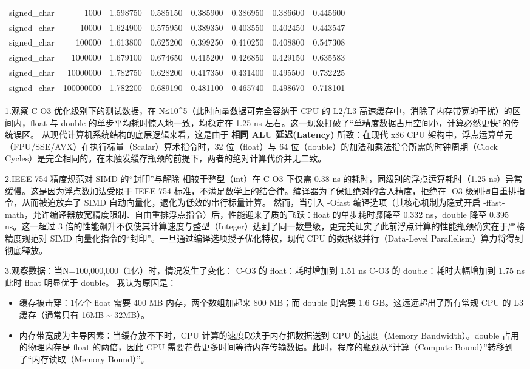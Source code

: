 \documentclass[12pt,fontset=none]{ctexart}
\providecommand{\tightlist}{%
  \setlength{\itemsep}{0pt}\setlength{\parskip}{0pt}}
\begin{document}
{\begin{longtable}[]{@{}lrrrrrrr@{}}
signed\_char & 1000 & 1.598750 & 0.585150 & 0.385900 & 0.386950 &
0.386600 & 0.445600 \\
signed\_char & 10000 & 1.624900 & 0.575950 & 0.389350 & 0.403550 &
0.402450 & 0.443547 \\
signed\_char & 100000 & 1.613800 & 0.625200 & 0.399250 & 0.410250 &
0.408800 & 0.547308 \\
signed\_char & 1000000 & 1.679100 & 0.674650 & 0.415200 & 0.426850 &
0.429150 & 0.635583 \\
signed\_char & 10000000 & 1.782750 & 0.628200 & 0.417350 & 0.431400 &
0.495500 & 0.732225 \\
signed\_char & 100000000 & 1.782200 & 0.689190 & 0.481100 & 0.465740 &
0.498670 & 0.718101 \\
\end{longtable}
}

1.观察 C-O3 优化级别下的测试数据，在 N≤10\^{}5（此时向量数据可完全容纳于
CPU 的 L2/L3 高速缓存中，消除了内存带宽的干扰）的区间内，float 与 double
的单步平均耗时惊人地一致，均稳定在 1.25 ns
左右。这一现象打破了``单精度数据占用空间小，计算必然更快''的传统误区。
从现代计算机系统结构的底层逻辑来看，这是由于 \textbf{相同 ALU
延迟(Latency)} 所致：在现代 x86 CPU
架构中，浮点运算单元（FPU/SSE/AVX）在执行标量（Scalar）算术指令时，32
位（float）与 64 位（double）的加法和乘法指令所需的时钟周期（Clock
Cycles）是完全相同的。在未触发缓存瓶颈的前提下，两者的绝对计算代价并无二致。

2.IEEE 754 精度规范对 SIMD 的``封印''与解除 相较于整型（int）在 C-O3
下仅需 0.38 ns 的耗时，同级别的浮点运算耗时（1.25
ns）异常缓慢。这是因为浮点数加法受限于 IEEE 754
标准，不满足数学上的结合律。编译器为了保证绝对的舍入精度，拒绝在 -O3
级别擅自重排指令，从而被迫放弃了 SIMD
自动向量化，退化为低效的串行标量计算。 然而，当引入 -Ofast
编译选项（其核心机制为隐式开启
-ffast-math，允许编译器放宽精度限制、自由重排浮点指令）后，性能迎来了质的飞跃：float
的单步耗时骤降至 0.332 ns，double 降至 0.395 ns。这一超过 3
倍的性能飙升不仅使其计算速度与整型（Integer）达到了同一数量级，更完美证实了此前浮点计算的性能瓶颈确实在于严格精度规范对
SIMD 向量化指令的``封印''。一旦通过编译选项授予优化特权，现代 CPU
的数据级并行（Data-Level Parallelism）算力将得到彻底释放。

3.观察数据：当N=100,000,000（1亿）时，情况发生了变化： C-O3 的
float：耗时增加到 1.51 ns C-O3 的 double：耗时大幅增加到 1.75 ns 此时
float 明显优于 double。 我认为原因是：

\begin{itemize}
\tightlist
\item
  缓存被击穿：1亿个 float 需要 400 MB 内存，两个数组加起来 800 MB；而
  double 则需要 1.6 GB。这远远超出了所有常规 CPU 的 L3 缓存（通常只有
  16MB \textasciitilde{} 32MB）。
\item
  内存带宽成为主导因素：当缓存放不下时，CPU
  计算的速度取决于内存把数据送到 CPU 的速度（Memory Bandwidth）。double
  占用的物理内存是 float 的两倍，因此 CPU
  需要花费更多时间等待内存传输数据。此时，程序的瓶颈从``计算（Compute
  Bound）''转移到了``内存读取（Memory Bound）''。
\end{itemize}
\end{document}

